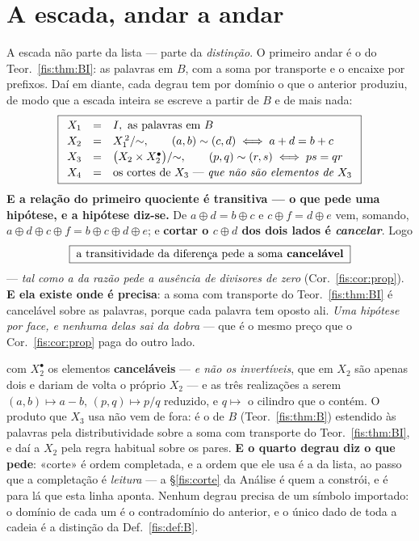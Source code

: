 \documentclass[livro.tex]{subfiles}
\begin{document}
\section{A escada, andar a andar}\label{fis:escada}

\noindent A escada não parte da lista --- parte da \emph{distinção}. O primeiro
andar é o do Teor.~\ref{fis:thm:BI}: as palavras em $B$, com a soma por
transporte e o encaixe por prefixos. Daí em diante, cada degrau tem por domínio o
que o anterior produziu, de modo que a escada inteira se escreve a partir de $B$
e de mais nada:
\[
\boxed{
\begin{array}{lll}
X_1 & = & I,\ \text{as palavras em } B\\[2pt]
X_2 & = & X_1^{\,2}/{\sim}, \qquad (a,b)\sim(c,d)\iff a+d=b+c\\[2pt]
X_3 & = & \bigl(X_2\times X_2^{\bullet}\bigr)/{\sim}, \qquad (p,q)\sim(r,s)\iff ps=qr\\[2pt]
X_4 & = & \text{os cortes de } X_3\ \text{---}\ \emph{que não são elementos de } X_3
\end{array}}
\]
\medskip\noindent\textbf{E a relação do primeiro quociente é transitiva --- o que
pede uma hipótese, e a hipótese diz-se.} De $a\oplus d=b\oplus c$ e
$c\oplus f=d\oplus e$ vem, somando, $a\oplus d\oplus c\oplus f=b\oplus c\oplus
d\oplus e$; e \textbf{cortar o $c\oplus d$ dos dois lados é \emph{cancelar}}. Logo
\[
\boxed{\;\text{a transitividade da diferença pede a soma \textbf{cancelável}}\;}
\]
--- \emph{tal como a da razão pede a ausência de divisores de zero}
(Cor.~\ref{fis:cor:prop}). \textbf{E ela existe onde é precisa}: a soma com
transporte do Teor.~\ref{fis:thm:BI} é cancelável sobre as palavras, porque cada
palavra tem oposto ali. \emph{Uma hipótese por face, e nenhuma delas sai da dobra}
--- que é o mesmo preço que o Cor.~\ref{fis:cor:prop} paga do outro lado.

\medskip\noindent com $X_2^{\bullet}$ os elementos \textbf{canceláveis} --- \emph{e não os
invertíveis}, que em $X_2$ são apenas dois e dariam de volta o próprio $X_2$ ---
e as três realizações a serem $(a,b)\mapsto a-b$, $(p,q)\mapsto p/q$ reduzido, e
$q\mapsto$ o cilindro que o contém. O produto que $X_3$ usa não vem de fora: é o
de $B$ (Teor.~\ref{fis:thm:B}) estendido às palavras pela distributividade sobre
a soma com transporte do Teor.~\ref{fis:thm:BI}, e daí a $X_2$ pela regra
habitual sobre os pares. \textbf{E o quarto degrau diz o que pede}: «corte» é
ordem completada, e a ordem que ele usa é a da lista, ao passo que a completação
é \emph{leitura} --- a §\ref{fis:corte} da Análise é quem a constrói, e é para lá
que esta linha aponta. Nenhum degrau precisa de um símbolo importado: o domínio
de cada um é o contradomínio do anterior, e o único dado de toda a cadeia é a
distinção da Def.~\ref{fis:def:B}.
\end{document}
